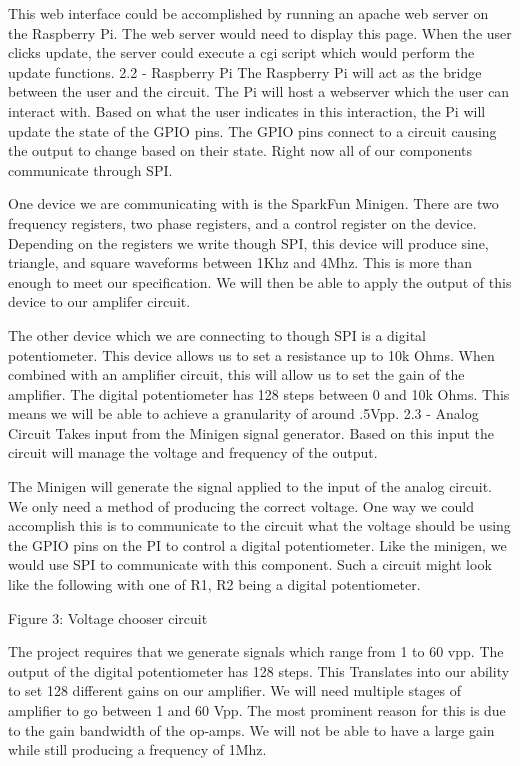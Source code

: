 \documentclass{article}	%
\begin{document}
\begin{multicols}{2}
This web interface could be accomplished by running an apache web server on the Raspberry Pi. The web server would need to display this page. When the user clicks update, the server could execute a cgi script which would perform the update functions.
2.2 - Raspberry Pi
The Raspberry Pi will act as the bridge between the user and the circuit. The Pi will host a webserver which the user can interact with. Based on what the user indicates in this interaction, the Pi will update the state of the GPIO pins. The GPIO pins connect to a circuit causing the output to change based on their state. Right now all of our components communicate through SPI.

One device we are communicating with is the SparkFun Minigen. There are two frequency registers, two phase registers, and a control register on the device. Depending on the registers we write though SPI, this device will produce sine, triangle, and square waveforms between 1Khz and 4Mhz. This is more than enough to meet our specification. We will then be able to apply the output of this device to our amplifer circuit.

The other device which we are connecting to though SPI is a digital potentiometer. This device allows us to set a resistance up to 10k Ohms. When combined with an amplifier circuit, this will allow us to set the gain of the amplifier. The digital potentiometer has 128 steps between 0 and 10k Ohms. This means we will be able to achieve a granularity of around .5Vpp.
2.3 - Analog Circuit
Takes input from the Minigen signal generator. Based on this input the circuit will manage the voltage and frequency of the output.

The Minigen will generate the signal applied to the input of the analog circuit. We only need a method of producing the correct voltage. One way we could accomplish this is to communicate to the circuit what the voltage should be using the GPIO pins on the PI to control a digital potentiometer. Like the minigen, we would use SPI to communicate with this component. Such a circuit might look like the following with one of R1, R2 being a digital potentiometer.

Figure 3: Voltage chooser circuit

The project requires that we generate signals which range from 1 to 60 vpp. The output of the digital potentiometer has 128 steps. This Translates into our ability to set 128 different gains on our amplifier. We will need multiple stages of amplifier to go between 1 and 60 Vpp. The most prominent reason for this is due to the gain bandwidth of the op-amps. We will not be able to have a large gain while still producing a frequency of 1Mhz.


\end{multicols}
\end{document}
